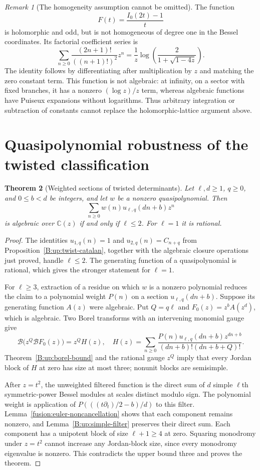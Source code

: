 \documentclass[11pt,a4paper]{article}
\newtheorem{theorem}{Theorem}[section]
\theoremstyle{definition}
\theoremstyle{remark}
\newtheorem{remark}[theorem]{Remark}
\numberwithin{equation}{section}
\begin{document}
\begin{remark}[The homogeneity assumption cannot be omitted]
The function
\[
 F(t)=\frac{I_0(2t)-1}{t}
\]
is holomorphic and odd, but is not homogeneous of degree one
in the Bessel coordinates.  Its factorial coefficient series is
\[
 \sum_{n\ge0}\frac{(2n+1)!}{((n+1)!)^2}z^n
 =\frac1z\log\left(\frac{2}{1+\sqrt{1-4z}}\right).
\]
The identity follows by differentiating after multiplication
by $z$ and matching the zero constant term.  This function
is not algebraic: at infinity, on a sector with fixed branches,
it has a nonzero $(\log z)/z$ term, whereas algebraic functions
have Puiseux expansions without logarithms.  Thus arbitrary
integration or subtraction of constants cannot replace the
holomorphic-lattice argument above.
\end{remark}

\section{Quasipolynomial robustness of the twisted classification}
\label{fusion:twisted-weights}

\begin{theorem}[Weighted sections of twisted determinants]
\label{fusion:twisted-weighted-dichotomy}
Let $\ell,d\ge1$, $q\ge0$, and $0\le b<d$ be integers, and
let $w$ be a nonzero quasipolynomial.  Then
\[
 \sum_{n\ge0}w(n)u_{\ell,q}(dn+b)z^n
\]
is algebraic over $\mathbb C(z)$ if and only if $\ell\le2$.
For $\ell=1$ it is rational.
\end{theorem}
\begin{proof}
The identities $u_{1,q}(n)=1$ and $u_{2,q}(n)=C_{n+q}$
from Proposition~\ref{B:up:twist-catalan}, together with the
algebraic closure operations just proved, handle $\ell\le2$.
The generating function of a quasipolynomial is rational,
which gives the stronger statement for $\ell=1$.

For $\ell\ge3$, extraction of a residue on which $w$ is a
nonzero polynomial reduces the claim to a polynomial weight
$P(n)$ on a section $u_{\ell,q}(dn+b)$.
Suppose its generating function $A(z)$ were algebraic.
Put $Q=q\ell$ and $F_0(z)=z^bA(z^d)$, which is algebraic.
Two Borel transforms with an intervening monomial gauge give
\[
 \mathcal B\bigl(z^Q\mathcal B F_0(z)\bigr)=z^QH(z),
 \quad
 H(z)=\sum_{n\ge0}
 \frac{P(n)u_{\ell,q}(dn+b)z^{dn+b}}
 {(dn+b)!(dn+b+Q)!}.
\]
Theorem~\ref{B:up:borel-bound} and the rational gauge $z^Q$
imply that every Jordan block of $H$ at zero has size at
most three; nonunit blocks are semisimple.

After $z=t^2$, the unweighted filtered function is the direct
sum of $d$ simple $\ell$th symmetric-power Bessel modules
at scales distinct modulo sign.  The polynomial weight is
application of
$P(((t\partial_t)/2-b)/d)$ to this filter.
Lemma~\ref{fusion:euler-noncancellation} shows that each
component remains nonzero, and
Lemma~\ref{B:up:simple-filter} preserves their direct sum.
Each component has a unipotent block of size $\ell+1\ge4$
at zero.  Squaring monodromy under $z=t^2$ cannot increase
any Jordan-block size, since every monodromy eigenvalue is
nonzero.  This contradicts the upper bound three and proves
the theorem.
\end{proof}
\end{document}
